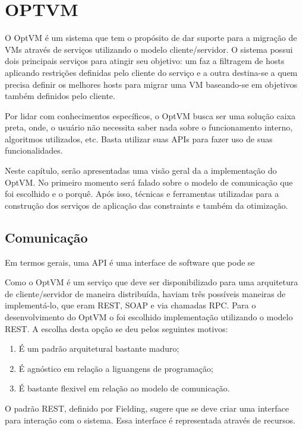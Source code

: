 \chapter{OPTVM}

O OptVM é um sistema que tem o propósito de dar suporte para a migração de VMs através de serviços utilizando o modelo cliente/servidor. 
O sistema possui dois principais serviços para atingir seu objetivo: 
um faz a filtragem de hosts aplicando restrições definidas pelo cliente do serviço e a 
outra destina-se a quem precisa definir os melhores hosts para migrar uma VM baseando-se em 
objetivos também definidos pelo cliente.

Por lidar com conhecimentos específicos, o OptVM busca ser uma solução caixa preta, onde, o usuário não necessita 
saber nada sobre o funcionamento interno, algoritmos utilizados, etc. Basta utilizar suas APIs para fazer uso de suas funcionalidades.

Neste capítulo, serão apresentadas uma visão geral da a implementação do OptVM. 
No primeiro momento será falado sobre o modelo de comunicação que foi escolhido e o porquê. 
Após isso, técnicas e ferramentas utilizadas para a construção dos serviços de aplicação das constraints e também da otimização.

\section{Comunicação}
Em termos gerais, uma API é uma interface de software que pode se

Como o OptVM é um serviço que deve ser disponibilizado para uma arquitetura de 
cliente/servidor de maneira distribuída, haviam três possíveis maneiras de implementá-lo, 
que eram REST, SOAP e via chamadas RPC. 
Para o desenvolvimento do OptVM o foi escolhido implementação utilizando o modelo REST. 
A escolha desta opção se deu pelos seguintes motivos:

\begin{enumerate}
\item É um padrão arquitetural bastante maduro;
\item É agnóstico em relação a liguangens de programação;
\item É bastante flexivel em relação ao modelo de comunicação.
\end{enumerate}

O padrão REST, definido por Fielding, sugere que se deve criar uma interface para interação com o sistema. Essa interface é representada
através de recursos.

